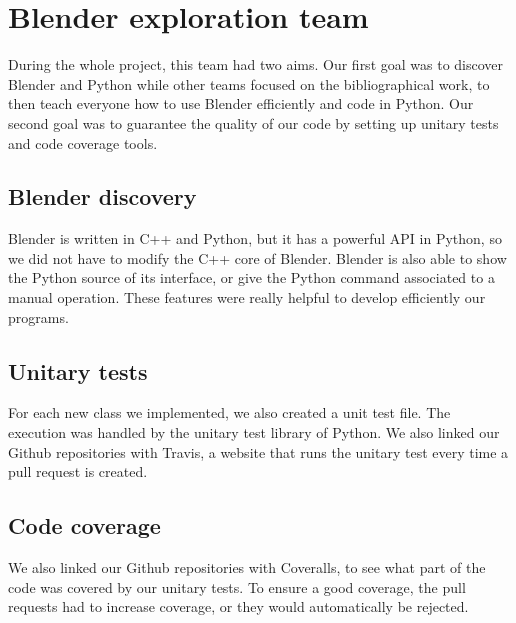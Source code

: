\section{Blender exploration team}

During the whole project, this team had two aims. Our first goal was
to discover Blender and Python while other teams focused on the
bibliographical work, to then teach everyone how to use Blender
efficiently and code in Python. Our second goal was to guarantee the
quality of our code by setting up unitary tests and code coverage
tools.

\subsection{Blender discovery}

Blender is written in C++ and Python, but it has a powerful API in
Python, so we did not have to modify the C++ core of Blender. Blender
is also able to show the Python source of its interface, or give the
Python command associated to a manual operation. These features were
really helpful to develop efficiently our programs.


\subsection{Unitary tests}

For each new class we implemented, we also created a unit test
file. The execution was handled by the unitary test library of
Python. We also linked our Github repositories with Travis, a website
that runs the unitary test every time a pull request is created.

\subsection{Code coverage}

We also linked our Github repositories with Coveralls, to see what
part of the code was covered by our unitary tests. To ensure a good
coverage, the pull requests had to increase coverage, or they would
automatically be rejected.

